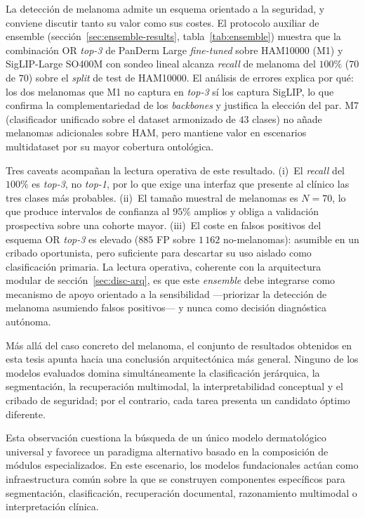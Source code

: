 La detección de melanoma admite un esquema orientado a la seguridad,
y conviene discutir tanto su valor como sus costes. El protocolo
auxiliar de ensemble (sección~\ref{sec:ensemble-results},
tabla~\ref{tab:ensemble}) muestra que la combinación OR
\emph{top-3} de PanDerm Large \emph{fine-tuned} sobre HAM10000 (M1)
y SigLIP-Large SO400M con sondeo lineal alcanza \emph{recall} de
melanoma del $100\%$ ($70$ de $70$) sobre el \emph{split} de
test de HAM10000. El análisis de errores explica por qué: los dos
melanomas que M1 no captura en \emph{top-3} sí los captura SigLIP,
lo que confirma la complementariedad de los \emph{backbones} y
justifica la elección del par. M7 (clasificador unificado sobre el
dataset armonizado de $43$ clases) no añade melanomas adicionales
sobre HAM, pero mantiene valor en escenarios multidataset por su
mayor cobertura ontológica.

Tres caveats acompañan la lectura operativa de este resultado.
(i)~El \emph{recall} del $100\%$ es \emph{top-3}, no
\emph{top-1}, por lo que exige una interfaz que presente al clínico
las tres clases más probables. (ii)~El tamaño muestral de melanomas
es $N = 70$, lo que produce intervalos de confianza al $95\%$
amplios y obliga a validación prospectiva sobre una cohorte mayor.
(iii)~El coste en falsos positivos del esquema OR \emph{top-3} es
elevado ($885$ FP sobre $1\,162$ no-melanomas): asumible en un
cribado oportunista, pero suficiente para descartar su uso aislado
como clasificación primaria. La lectura operativa, coherente con la
arquitectura modular de sección~\ref{sec:disc-arq}, es que este
\emph{ensemble} debe integrarse como mecanismo de apoyo orientado a la
sensibilidad ---priorizar la detección de melanoma asumiendo falsos
positivos--- y nunca como decisión diagnóstica autónoma.

Más allá del caso concreto del melanoma, el conjunto de resultados
obtenidos en esta tesis apunta hacia una conclusión arquitectónica más
general. Ninguno de los modelos evaluados domina simultáneamente la
clasificación jerárquica, la segmentación, la recuperación multimodal,
la interpretabilidad conceptual y el cribado de seguridad; por el
contrario, cada tarea presenta un candidato óptimo diferente.

Esta observación cuestiona la búsqueda de un único modelo dermatológico
universal y favorece un paradigma alternativo basado en la composición
de módulos especializados. En este escenario, los modelos fundacionales
actúan como infraestructura común sobre la que se construyen componentes
específicos para segmentación, clasificación, recuperación documental,
razonamiento multimodal o interpretación clínica.


